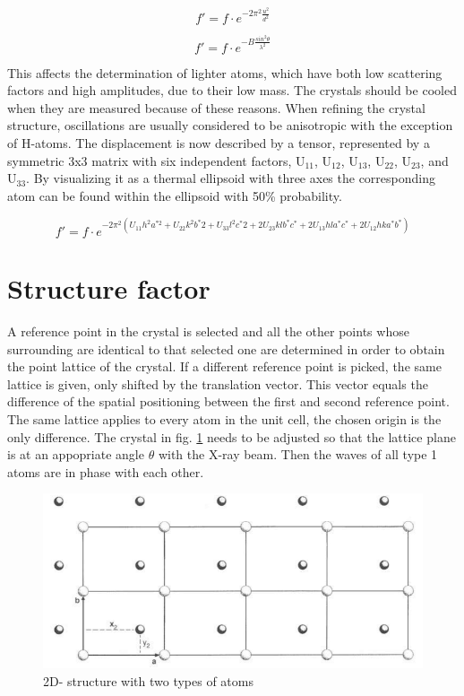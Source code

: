 \begin{equation}
f' = f \cdot e^{-2\pi^2 \frac{u^2}{d^2}}
\label{eq:os}
\end{equation}



\begin{equation}
f' = f \cdot e^{-B\frac {sin^2 \theta}{\lambda^2}}
\label{eqdwfb}
\end{equation}

This affects the determination of lighter atoms, which have both low scattering factors and high amplitudes, due to their low mass. The crystals should be cooled when they are measured because of these reasons. When refining the crystal structure, oscillations are usually considered to be anisotropic with the exception of H-atoms. The displacement is now described by a tensor, represented by a symmetric 3x3 matrix with six independent factors,  U$_{11}$,  U$_{12}$,  U$_{13}$,  U$_{22}$,  U$_{23}$,  and U$_{33}$. By visualizing it as a thermal ellipsoid with three axes the corresponding atom can be found within the ellipsoid with 50\% probability. 


\begin{equation}
f'=f  \cdot e^{-2\pi^2(U_{11}h^2a^{*2}+U_{22}k^2b^*2+U_{33}l^2c^*2+2U_{23}klb^*c^* +2U_{13}hla^*c^*+2U_{12}hka^*b^*)}
\end{equation}


\section{Structure factor}

A reference point in the crystal is selected and all the other points whose surrounding are identical to that selected one  are determined in order to obtain the point lattice of the crystal. If a different reference point is picked, the same lattice is given, only shifted by the translation vector. This vector equals the difference of the spatial positioning between the first and second reference point. The same lattice applies to every atom in the unit cell, the chosen origin is the only difference. The crystal in fig. \ref{fig:pl} needs to be adjusted so that the lattice plane is at an appopriate angle $\theta$ with the X-ray beam. Then the waves of all type 1 atoms are in phase with each other.
\begin{figure}[htpb!]
\centering
\includegraphics[width=1\textwidth]{figures/pointlattice.png}
\caption{2D- structure with two types of atoms \cite{massa} }
\label{fig:pl}
\end{figure}



